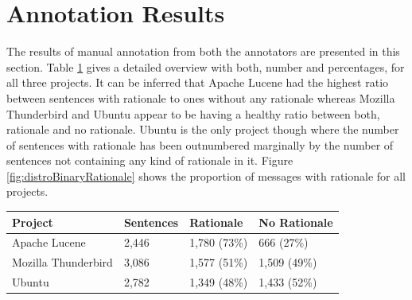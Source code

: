 \documentclass[a4paper,12pt,twoside]{report}
\begin{document}
\section{Annotation Results}
The results of manual annotation from both the annotators are presented in this section. Table \ref{tab:distroBinaryRationale} gives a detailed overview with both, number and percentages, for all three projects. It can be inferred that Apache Lucene had the highest ratio between sentences with rationale to ones without any rationale whereas Mozilla Thunderbird and Ubuntu appear to be having a healthy ratio between both, rationale and no rationale. Ubuntu is the only project though where the number of sentences with rationale has been outnumbered marginally by the number of sentences not containing any kind of rationale in it. Figure \ref{fig:distroBinaryRationale} shows the proportion of messages with rationale for all projects. 
\begin{table}[H] %
    \centering
    \begin{adjustbox}{max width=\columnwidth}
    \def\arraystretch{1} %
    \begin{tabular}{p{4cm} p{4cm} p{4cm} p{4cm}}
        \toprule
        \textbf{Project} & \textbf{Sentences} & \textbf{Rationale} & \textbf{No Rationale}\\
        \midrule
			Apache Lucene & 2,446 & 1,780 (73\%) & 666 (27\%)\\
			Mozilla Thunderbird & 3,086 & 1,577 (51\%) & 1,509 (49\%)\\ 
			Ubuntu & 2,782 & 1,349 (48\%) & 1,433 (52\%)\\
        \midrule
    \end{tabular}
    \end{adjustbox}
    \label{tab:distroBinaryRationale}
\end{table}
\end{document}
